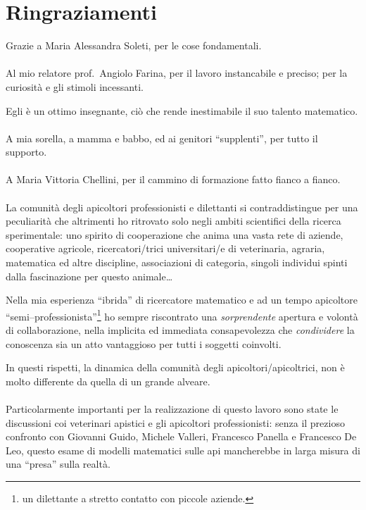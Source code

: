 \cleardoublepage
{} %
\section*{Ringraziamenti}
Grazie a Maria Alessandra Soleti, per le cose fondamentali.

\paragraph{}
Al mio relatore prof.~Angiolo Farina, per il lavoro instancabile e preciso; per la curiosità e gli stimoli incessanti.

Egli è un ottimo insegnante, ciò che rende inestimabile il suo talento matematico.

\paragraph{}
A mia sorella, a mamma e babbo, ed ai genitori ``supplenti'', per tutto il supporto.

\paragraph{}
A Maria Vittoria Chellini, per il cammino di formazione fatto fianco a fianco.

\paragraph{}
La comunità degli apicoltori professionisti e dilettanti si contraddistingue per una peculiarità
che altrimenti ho ritrovato solo negli ambiti scientifici della ricerca sperimentale: uno spirito di cooperazione
che anima una vasta rete di aziende, cooperative agricole, ricercatori/trici universitari/e di veterinaria, agraria,
matematica ed altre discipline, associazioni di categoria, singoli individui spinti dalla fascinazione per
questo animale\dots

Nella mia esperienza ``ibrida'' di ricercatore matematico e ad un tempo
apicoltore ``semi--professionista''\footnote{\ie un dilettante a stretto contatto con piccole aziende.}
ho sempre riscontrato una \emph{sorprendente} apertura e volontà di collaborazione, nella implicita ed immediata
consapevolezza che \emph{condividere} la conoscenza sia un atto vantaggioso per tutti i soggetti coinvolti.

In questi rispetti, la dinamica della comunità degli apicoltori/apicoltrici, non è molto differente da
quella di un grande alveare.

\paragraph{}
Particolarmente importanti per la realizzazione di questo lavoro sono state le discussioni coi veterinari apistici
e gli apicoltori professionisti: senza il prezioso confronto con Giovanni Guido, Michele Valleri, Francesco Panella
e Francesco De Leo, questo esame di modelli matematici sulle api mancherebbe in larga misura di una ``presa'' sulla realtà.



